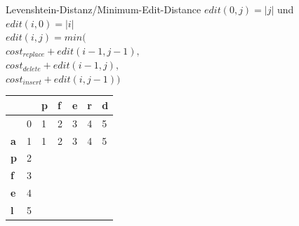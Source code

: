 \documentclass[aspectratio=169]{beamer}
\begin{document}
\begin{frame}[fragile]{Levenshtein-Distanz/Minimum-Edit-Distance}
$edit(0,j)=|j|$ und $edit(i,0)=|i|$\\
$edit(i,j)=min($\\
$cost_{replace} + edit(i-1,j-1),  $\\
$cost_{delete}+ edit(i-1,j),$\\
$cost_{insert}+ edit(i,j-1))  $\\
\begin{table}[]
\begin{tabular}{|l|l|l|l|l|l|l|}
\hline
           & \textbf{} & \textbf{p} & \textbf{f} & \textbf{e} & \textbf{r} & \textbf{d} \\ \hline
\textbf{}  & 0         & 1          & 2          & 3          & 4          & 5          \\ \hline
\textbf{a} & 1         & 1          & 2          & 3          & 4          & 5          \\ \hline
\textbf{p} & 2         &            &            &            &            &            \\ \hline
\textbf{f} & 3         &            &            &            &            &            \\ \hline
\textbf{e} & 4         &            &            &            &            &            \\ \hline
\textbf{l} & 5         &            &            &            &            &            \\ \hline
\end{tabular}
\end{table}
\end{frame} 
\end{document}
